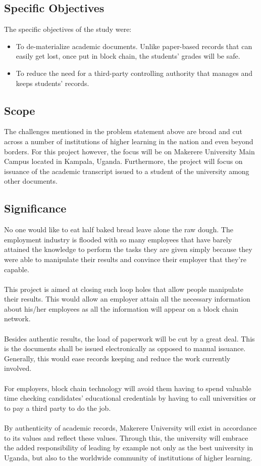 \subsection{Specific Objectives}
The specific objectives of the study were: 
\begin{itemize}
\item To de-materialize academic documents. Unlike paper-based records that can easily get lost, once put in block chain, the students' grades will be safe.
\item To reduce the need for a third-party controlling authority that manages and keeps students' records.
\end{itemize}
\subsection{Scope}

The challenges mentioned in the problem statement above are broad and cut across a number of institutions of higher learning in the nation and even beyond borders. For this project however, the focus will be on Makerere University Main Campus located in Kampala, Uganda. Furthermore, the project will focus on issuance of the academic transcript issued to a student of the university among other documents.

\subsection{Significance}

No one would like to eat half baked bread leave alone the raw dough. The employment industry is flooded with so many employees that have barely attained the knowledge to perform the tasks they are given simply because they were able to manipulate their results and convince their employer that they’re capable. \\ \\
This project is aimed at closing such loop holes that allow people manipulate their results. This would allow an employer attain all the necessary information about his/her employees as all the information will appear on a block chain network. \\ \\
Besides authentic results, the load of paperwork will be cut by a great deal. This is the documents shall be issued electronically as opposed to manual issuance. Generally, this would ease records keeping and reduce the work currently involved. \\ \\
For employers, block chain technology will avoid them having to spend valuable time checking candidates' educational credentials by having to call universities or to pay a third party to do the job. \\ \\
By authenticity of academic records, Makerere University will exist in accordance to its values and reflect these values. Through this, the university will embrace the added responsibility of leading by example not only as the best university in Uganda, but also to the worldwide community of institutions of higher learning. \\ 